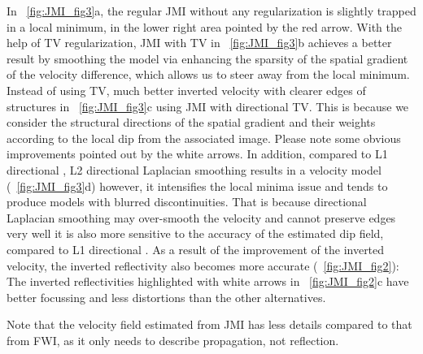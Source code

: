 In ~\ref{fig:JMI_fig3}a, the regular JMI without any regularization is slightly trapped in a local minimum,  in the lower right area pointed by the red arrow. With the help of TV regularization, JMI with  TV in ~\ref{fig:JMI_fig3}b achieves a better result by smoothing the model via enhancing the sparsity of the spatial gradient of the velocity difference, which allows us to steer away from the local minimum. Instead of using  TV, much better inverted velocity with clearer edges of structures  in ~\ref{fig:JMI_fig3}c using JMI with directional TV. This is because we consider the structural directions of the spatial gradient and their weights according to the local dip from the associated image. Please note some obvious improvements pointed out by the white arrows. In addition, compared to L1 directional , L2 directional Laplacian smoothing results in a  velocity model (~\ref{fig:JMI_fig3}d)\new{;}\old{,} however, it intensifies the local minima issue and tends to produce models with blurred discontinuities. That is because  directional Laplacian smoothing may over-smooth the velocity and cannot preserve edges very well\new{;} it is also more sensitive to the accuracy of the estimated dip field, compared to L1 directional .  As a result of the improvement of the inverted velocity, the inverted reflectivity also becomes more accurate (~\ref{fig:JMI_fig2}): The inverted reflectivities highlighted with white arrows in ~\ref{fig:JMI_fig2}c have better focussing and less distortions than the other alternatives. 

Note that the velocity field estimated from JMI has less details compared to that from FWI, as it only needs to describe propagation, not reflection. 

